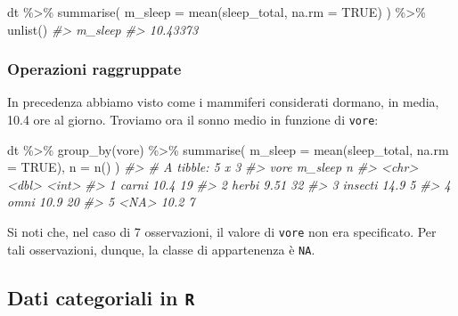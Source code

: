\documentclass[
]{memoir}
\newenvironment{Shaded}{\begin{snugshade}}{\end{snugshade}}
\newcommand{\AttributeTok}[1]{\textcolor[rgb]{0.77,0.63,0.00}{#1}}
\newcommand{\CommentTok}[1]{\textcolor[rgb]{0.56,0.35,0.01}{\textit{#1}}}
\newcommand{\ConstantTok}[1]{\textcolor[rgb]{0.00,0.00,0.00}{#1}}
\newcommand{\FunctionTok}[1]{\textcolor[rgb]{0.00,0.00,0.00}{#1}}
\newcommand{\NormalTok}[1]{#1}
\newcommand{\SpecialCharTok}[1]{\textcolor[rgb]{0.00,0.00,0.00}{#1}}
\theoremstyle{definition}
\theoremstyle{definition}
\theoremstyle{definition}
\theoremstyle{definition}
\theoremstyle{remark}
\begin{document}
\begin{Shaded}
\begin{Highlighting}[]
\NormalTok{dt }\SpecialCharTok{\%\textgreater{}\%}
  \FunctionTok{summarise}\NormalTok{(}
    \AttributeTok{m\_sleep =} \FunctionTok{mean}\NormalTok{(sleep\_total, }\AttributeTok{na.rm =} \ConstantTok{TRUE}\NormalTok{)}
\NormalTok{  ) }\SpecialCharTok{\%\textgreater{}\%}
  \FunctionTok{unlist}\NormalTok{()}
\CommentTok{\#\textgreater{}  m\_sleep }
\CommentTok{\#\textgreater{} 10.43373}
\end{Highlighting}
\end{Shaded}

\hypertarget{operazioni-raggruppate}{%
\subsubsection{Operazioni raggruppate}\label{operazioni-raggruppate}}

In precedenza abbiamo visto come i mammiferi considerati dormano, in
media, 10.4 ore al giorno. Troviamo ora il sonno medio in funzione di
\texttt{vore}:

\begin{Shaded}
\begin{Highlighting}[]
\NormalTok{dt }\SpecialCharTok{\%\textgreater{}\%}
  \FunctionTok{group\_by}\NormalTok{(vore) }\SpecialCharTok{\%\textgreater{}\%}
  \FunctionTok{summarise}\NormalTok{(}
    \AttributeTok{m\_sleep =} \FunctionTok{mean}\NormalTok{(sleep\_total, }\AttributeTok{na.rm =} \ConstantTok{TRUE}\NormalTok{),}
    \AttributeTok{n =} \FunctionTok{n}\NormalTok{()}
\NormalTok{  )}
\CommentTok{\#\textgreater{} \# A tibble: 5 x 3}
\CommentTok{\#\textgreater{}   vore    m\_sleep     n}
\CommentTok{\#\textgreater{}   \textless{}chr\textgreater{}     \textless{}dbl\textgreater{} \textless{}int\textgreater{}}
\CommentTok{\#\textgreater{} 1 carni     10.4     19}
\CommentTok{\#\textgreater{} 2 herbi      9.51    32}
\CommentTok{\#\textgreater{} 3 insecti   14.9      5}
\CommentTok{\#\textgreater{} 4 omni      10.9     20}
\CommentTok{\#\textgreater{} 5 \textless{}NA\textgreater{}      10.2      7}
\end{Highlighting}
\end{Shaded}

Si noti che, nel caso di 7 osservazioni, il valore di \texttt{vore} non era
specificato. Per tali osservazioni, dunque, la classe di appartenenza è
\texttt{NA}.

\hypertarget{dati-categoriali-in-r}{%
\subsection{\texorpdfstring{Dati categoriali in \texttt{R}}{Dati categoriali in R}}\label{dati-categoriali-in-r}}
\end{document}
